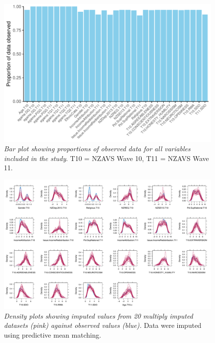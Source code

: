 \documentclass[
  man,floatsintext]{apa6}
\begin{document}
\newpage




\begin{figure}
\centering
\includegraphics{manuscript_files/figure-latex/plotObs-1.pdf}
\caption{\label{fig:plotObs}\emph{Bar plot showing proportions of observed data for all
variables included in the study}. T10 = NZAVS Wave 10, T11 = NZAVS Wave 11.}
\end{figure}

\newpage





\begin{figure}
\centering
\includegraphics{manuscript_files/figure-latex/impPlot-1.pdf}
\caption{\label{fig:impPlot}\emph{Density plots showing imputed values from 20 multiply
imputed datasets (pink) against observed values (blue).} Data were imputed
using predictive mean matching.}
\end{figure}
\end{document}
